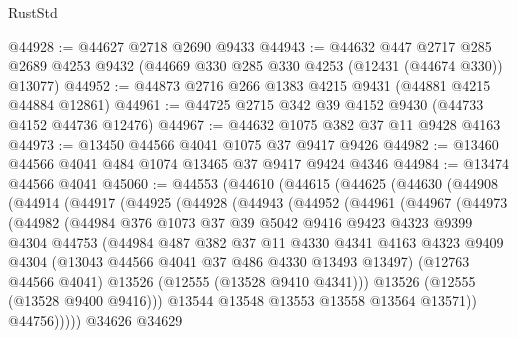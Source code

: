 \begin{lexlean}{RustStd}
\begin{coremodule}
@44928 := @44627 @2718 @2690 @9433
@44943 := @44632
    @447
    @2717
    @285
    @2689
    @4253
    @9432
    (@44669 @330 @285 @330 @4253 (@12431 (@44674 @330)) @13077)
@44952 := @44873 @2716 @266 @1383 @4215 @9431 (@44881 @4215 @44884 @12861)
@44961 := @44725 @2715 @342 @39 @4152 @9430 (@44733 @4152 @44736 @12476)
@44967 := @44632 @1075 @382 @37 @11 @9428 @4163
@44973 := @13450 @44566 @4041 @1075 @37 @9417 @9426
@44982 := @13460 @44566 @4041 @484 @1074 @13465 @37 @9417 @9424 @4346
@44984 := @13474 @44566 @4041
@45060 := @44553
    (@44610
      (@44615
        (@44625
          (@44630
            (@44908
              (@44914
                (@44917
                  (@44925
                    (@44928
                      (@44943
                        (@44952
                          (@44961
                            (@44967
                              (@44973
                                (@44982
                                  (@44984
                                    @376
                                    @1073
                                    @37
                                    @39
                                    @5042
                                    @9416
                                    @9423
                                    @4323
                                    @9399
                                    @4304
                                    @44753
                                    (@44984
                                      @487
                                      @382
                                      @37
                                      @11
                                      @4330
                                      @4341
                                      @4163
                                      @4323
                                      @9409
                                      @4304
                                      (@13043 @44566 @4041 @37 @486 @4330 @13493 @13497)
                                      (@12763 @44566 @4041)
                                      @13526
                                      (@12555 (@13528 @9410 @4341)))
                                    @13526
                                    (@12555 (@13528 @9400 @9416)))
                                  @13544
                                  @13548
                                  @13553
                                  @13558
                                  @13564
                                  @13571))
                              @44756)))))
                    @34626
                    @34629

\end{coremodule}
\end{lexlean}
